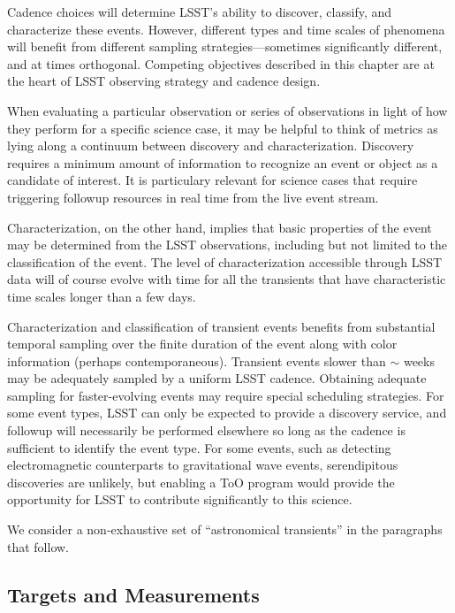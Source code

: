 Cadence choices will determine LSST's ability to discover, classify, and
characterize these events. However, different types and time scales of
phenomena will benefit from different sampling strategies---sometimes
significantly different, and at times orthogonal.  Competing objectives
described in this chapter are at the heart of LSST observing strategy and
cadence design.

When evaluating a particular observation or series of observations in
light of how they perform for a specific science case, it may be
helpful to think of metrics as lying along a continuum between
discovery and characterization. Discovery requires a minimum amount of
information to recognize an event or object as a candidate of
interest.  It is particulary relevant for science cases that require
triggering followup resources in real time from the live event stream.

Characterization, on the other hand, implies
that basic properties of the event may be determined from the
LSST observations, including but not limited to the classification of
the event. The level of characterization accessible through LSST data
will of course evolve with time for all the transients that have
characteristic time scales longer than a few days.

Characterization and classification of transient events 
benefits from substantial temporal sampling over the finite duration of the
event along with color information (perhaps contemporaneous). 
Transient events slower than $\sim$ weeks may be adequately sampled by
a uniform LSST cadence.  Obtaining adequate sampling for faster-evolving
events may require special scheduling
strategies.  For some event types, LSST can only be expected to
provide a discovery service, and followup will necessarily be
performed elsewhere so long as the cadence is sufficient to identify the
event type.
For some events, such as detecting electromagnetic counterparts to
gravitational wave events,
serendipitous discoveries are unlikely, but
enabling a ToO program would provide the opportunity for LSST to
contribute significantly to this science.


We consider a non-exhaustive set of ``astronomical transients'' in the
paragraphs that follow.

\subsection{Targets and Measurements}
\label{sec:\chpname:targets}

